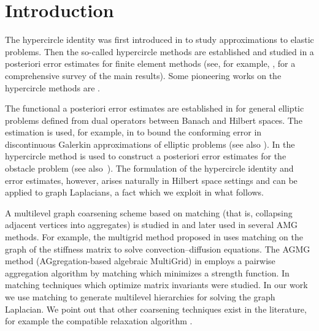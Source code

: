 \documentclass[ ]{elsarticle}
\numberwithin{equation}{section}
\newcommand{\red}[1]{#1}
\begin{document}
\section{Introduction}
\red{The hypercircle identity was first introduced in
  \cite{1947PragerW_SyngeJ-aa} to study approximations to elastic
  problems.} Then the so-called hypercircle methods are established
and studied in a posteriori error estimates for finite element methods
\red{(see, for example, \cite{MR3076038}, for a comprehensive survey
  of the main results)}. Some pioneering works on the hypercircle
methods are \cite{1975Ladeveze, 1999DestuynderMetivet}.

The functional a posteriori error estimates are established in
\cite{MR2458008} for general elliptic problems defined from dual
operators between Banach and Hilbert spaces. The estimation is used,
for example, in \cite{MR2502931} to bound the conforming error in
discontinuous Galerkin approximations of elliptic problems (see also
\cite{MR2526991,MR2813186}). In \cite{MR2425501} the hypercircle
method is used to construct a posteriori error estimates for the
obstacle problem (see also~\cite{MR2095603}). The formulation of the
hypercircle identity and error estimates, however, arises naturally in
Hilbert space settings and can be applied to graph Laplacians, a fact
which we exploit in what follows.

A multilevel graph coarsening scheme based on matching (that is,
collapsing adjacent vertices into aggregates) is studied in
\cite{MR1639073} and later used in several AMG methods. For example,
the multigrid method proposed in \cite{MR1964291} uses matching on the
graph of the stiffness matrix to solve convection--diffusion
equations. The AGMG method (AGgregation-based algebraic MultiGrid) in
\cite{MR2914316} employs a pairwise aggregation algorithm by matching
which minimizes a strength function. In \cite{MR3264812} matching
techniques which optimize matrix invariants were studied. In our work
we use matching to generate multilevel hierarchies for solving the
graph Laplacian. We point out that other coarsening techniques exist
in the literature, for example the compatible relaxation algorithm
\cite{MR1760015, MR2065813, MR2114296, MR2652083}.
\end{document}
